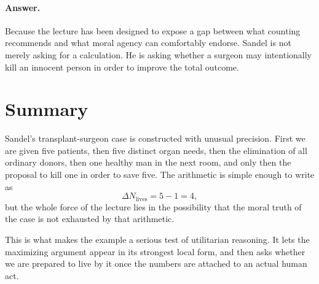 \paragraph{Answer.} Because the lecture has been designed to expose a gap between what counting recommends and what moral agency can comfortably endorse. Sandel is not merely asking for a calculation. He is asking whether a surgeon may intentionally kill an innocent person in order to improve the total outcome.

\section{Summary}

Sandel's transplant-surgeon case is constructed with unusual precision. First we are given five patients, then five distinct organ needs, then the elimination of all ordinary donors, then one healthy man in the next room, and only then the proposal to kill one in order to save five. The arithmetic is simple enough to write as
\begin{equation}
\Delta N_{\text{lives}} = 5 - 1 = 4,
\end{equation}
but the whole force of the lecture lies in the possibility that the moral truth of the case is not exhausted by that arithmetic.

This is what makes the example a serious test of utilitarian reasoning. It lets the maximizing argument appear in its strongest local form, and then asks whether we are prepared to live by it once the numbers are attached to an actual human act.
